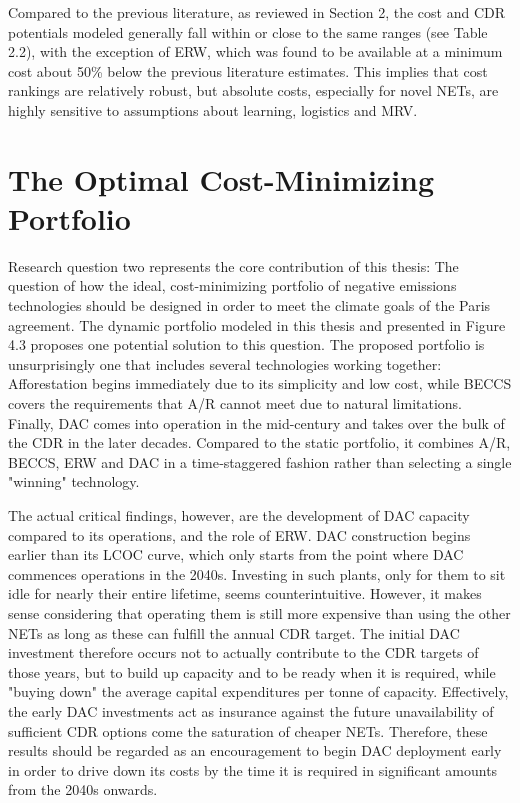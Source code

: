 Compared to the previous literature, as reviewed in Section 2, the cost and CDR potentials modeled generally fall within or close to the same ranges (see Table 2.2), with the exception of ERW, which was found to be available at a minimum cost about 50\% below the previous literature estimates. This implies that cost rankings are relatively robust, but absolute costs, especially for novel NETs, are highly sensitive to assumptions about learning, logistics and MRV.

\section{The Optimal Cost-Minimizing Portfolio}
Research question two represents the core contribution of this thesis: The question of how the ideal, cost-minimizing portfolio of negative emissions technologies should be designed in order to meet the climate goals of the Paris agreement. The dynamic portfolio modeled in this thesis and presented in Figure 4.3 proposes one potential solution to this question. The proposed portfolio is unsurprisingly one that includes several technologies working together: Afforestation begins immediately due to its simplicity and low cost, while BECCS covers the requirements that A/R cannot meet due to natural limitations. Finally, DAC comes into operation in the mid-century and takes over the bulk of the CDR in the later decades. Compared to the static portfolio, it combines A/R, BECCS, ERW and DAC in a time‑staggered fashion rather than selecting a single "winning" technology.\vspace{2mm}

The actual critical findings, however, are the development of DAC capacity compared to its operations, and the role of ERW. DAC construction begins earlier than its LCOC curve, which only starts from the point where DAC commences operations in the 2040s. Investing in such plants, only for them to sit idle for nearly their entire lifetime, seems counterintuitive. However, it makes sense considering that operating them is still more expensive than using the other NETs as long as these can fulfill the annual CDR target. The initial DAC investment therefore occurs not to actually contribute to the CDR targets of those years, but to build up capacity and to be ready when it is required, while "buying down" the average capital expenditures per tonne of capacity. Effectively, the early DAC investments act as insurance against the future unavailability of sufficient CDR options come the saturation of cheaper NETs. Therefore, these results should be regarded as an encouragement to begin DAC deployment early in order to drive down its costs by the time it is required in significant amounts from the 2040s onwards.\vspace{2mm}


